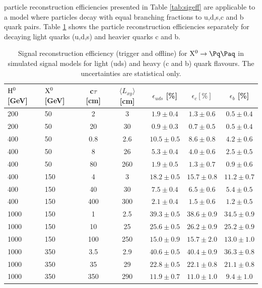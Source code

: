 \X particle reconstruction efficiencies presented in Table \ref{tab:sigeff} 
are applicable to a model where \X particles decay with equal branching fractions to u,d,s,c and b quark pairs.
Table \ref{tab:sigeffflavor} shows the \X particle reconstruction efficiencies separately for 
\X decaying light quarks (u,d,s) and
heavier quarks c and b. 

\begin{table}[htbp]
\caption{
Signal reconstruction efficiency (trigger and offline) for $\X \to \qq$ in simulated signal models for light (uds) and heavy (c and b) quark flavours.  The uncertainties are statistical only. \label{tab:sigeffflavor}}
\centering
\begin{tabular}{llccccc}
\hline
$\mathrm{H}^{0}$ [GeV] & $\mathrm{X^{0}}$ [GeV] & c$\tau$ [cm] & $\langle L_{xy} \rangle$ [cm] & $\epsilon_{uds}$ [\%] & $\epsilon_{c} [\%] $ & $\epsilon_{b}$ [\%]\\
\hline
200 & 50 & 2 & 3 & $1.9\pm0.4$ & $1.3\pm0.6$ & $0.5\pm0.4$ \\
200 & 50 & 20 & 30 & $0.9\pm0.3$ & $0.7\pm0.5$ & $0.5\pm0.4$ \\
\hline
400 & 50 & 0.8 & 2.6 & $10.5\pm0.5$ & $8.6\pm0.8$ & $4.2\pm0.6$ \\
400 & 50 & 8 & 26 & $5.3\pm0.4$ & $4.0\pm0.6$ & $2.5\pm0.5$ \\
400 & 50 & 80 & 260 & $1.9\pm0.5$ & $1.3\pm0.7$ & $0.9\pm0.6$ \\
\hline
400 & 150 & 4 & 3 &  $18.2\pm0.5$ & $15.7\pm0.8$ & $11.2\pm0.7$ \\
400 & 150 & 40 & 30 & $7.5\pm0.4$ & $6.5\pm0.6$ & $5.4\pm0.5$ \\
400 & 150 & 400 & 300 & $2.1\pm0.4$ & $1.5\pm0.6$ & $1.2\pm0.5$ \\
\hline
1000 & 150 & 1 & 2.5 & $39.3\pm0.5$ & $38.6\pm0.9$ & $34.5\pm0.9$ \\
1000 & 150 & 10 & 25 & $25.6\pm0.5$ & $26.2\pm0.9$ & $25.2\pm0.9$ \\
1000 & 150 & 100 & 250 & $15.0\pm0.9$ & $15.7\pm2.0$ & $13.0\pm1.0$ \\
\hline
1000 & 350 & 3.5 & 2.9 &  $40.6\pm0.5$ & $40.4\pm0.9$ & $36.3\pm0.8$ \\
1000 & 350 & 35 & 29 & $22.8\pm0.5$ & $22.1\pm0.8$ & $21.1\pm0.8$ \\
1000 & 350 & 350 & 290 & $11.9\pm0.7$ & $11.0\pm1.0$ & $9.4\pm1.0$ \\
\hline
\end{tabular}
\end{table}

